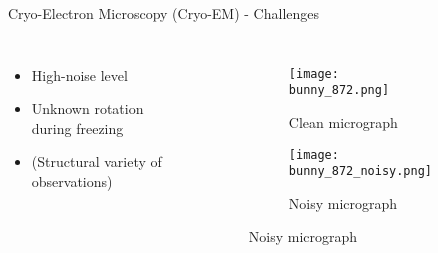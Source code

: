 \begin{frame}[c]{Cryo-Electron Microscopy (Cryo-EM) - Challenges}
    \begin{columns}[c]
        
        \begin{itemize}
            \item High-noise level 
            \item Unknown rotation during freezing
            \item (Structural variety of observations)
        \end{itemize}


        \begin{figure}
            \centering
            \begin{subfigure}[t]{0.5\textwidth}
                \texttt{[image: bunny\_872.png]}
                \caption{Clean micrograph}
            \end{subfigure}\hfill                
            \begin{subfigure}[t]{0.5\textwidth}
                \texttt{[image: bunny\_872\_noisy.png]}
                \caption{Noisy micrograph}
            \end{subfigure}\hfill                
        \end{figure}

    \end{columns}

\end{frame}

